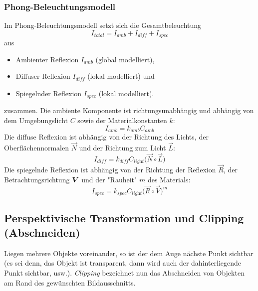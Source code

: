 				\subsubsection{Phong-Beleuchtungsmodell}
					Im Phong-Beleuchtungsmodell setzt sich die Gesamtbeleuchtung
					\begin{equation*}
						I_\textit{total} = I_\textit{amb} + I_\textit{diff} + I_\textit{spec}
					\end{equation*}
					aus
					\begin{itemize}
						\item Ambienter Reflexion \( I_\textit{amb} \) (global modelliert),
						\item Diffuser Reflexion \( I_\textit{diff} \) (lokal modelliert) und
						\item Spiegelnder Reflexion \( I_\textit{spec} \) (lokal modelliert).
					\end{itemize}
					zusammen. Die ambiente Komponente ist richtungsunabhängig und abhängig von dem Umgebungslicht \(C\) sowie der Materialkonstanten \(k\):
					\begin{equation*}
						I_\textit{amb} = k_\textit{amb} C_\textit{amb}
					\end{equation*}
					Die diffuse Reflexion ist abhängig von der Richtung des Lichts, der Oberflächennormalen \( \vec{N} \) und der Richtung zum Licht \( \vec{L} \):
					\begin{equation*}
						I_\textit{diff} = k_\textit{diff} C_\textit{light} \big( \vec{N} \circ \vec{L} \big)
					\end{equation*}
					Die spiegelnde Reflexion ist abhängig von der Richtung der Reflexion \( \vec{R} \), der Betrachtungsrichtung \( \bm{V} \) und der "Rauheit" \(m\) des Materials:
					\begin{equation*}
						I_\textit{spec} = k_\textit{spec} C_\textit{light} \big( \vec{R} \circ \vec{V} \big)^m
					\end{equation*}

			\subsection{Perspektivische Transformation und Clipping (Abschneiden)}
				Liegen mehrere Objekte voreinander, so ist der dem Auge nächste Punkt sichtbar (es sei denn, das Objekt ist transparent, dann wird auch der dahinterliegende Punkt sichtbar, usw.). \emph{Clipping} bezeichnet nun das Abschneiden von Objekten am Rand des gewünschten Bildausschnitts.


